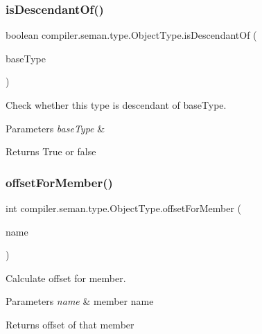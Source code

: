 \subsubsection{\texorpdfstring{is\+Descendant\+Of()}{isDescendantOf()}}
{\footnotesize\ttfamily boolean compiler.\+seman.\+type.\+Object\+Type.\+is\+Descendant\+Of (\begin{DoxyParamCaption}\item[{\hyperlink{classcompiler_1_1seman_1_1type_1_1_object_type}{Object\+Type}}]{base\+Type }\end{DoxyParamCaption})}

Check whether this type is descendant of base\+Type. 
\begin{DoxyParams}{Parameters}
{\em base\+Type} & \\
\hline
\end{DoxyParams}
\begin{DoxyReturn}{Returns}
True or false 
\end{DoxyReturn}
\mbox{\label{classcompiler_1_1seman_1_1type_1_1_object_type_a2b0119cb5d5451bbf5cad5e9844c136f}} 
\subsubsection{\texorpdfstring{offset\+For\+Member()}{offsetForMember()}}
{\footnotesize\ttfamily int compiler.\+seman.\+type.\+Object\+Type.\+offset\+For\+Member (\begin{DoxyParamCaption}\item[{String}]{name }\end{DoxyParamCaption})}

Calculate offset for member. 
\begin{DoxyParams}{Parameters}
{\em name} & member name \\
\hline
\end{DoxyParams}
\begin{DoxyReturn}{Returns}
offset of that member 
\end{DoxyReturn}
\mbox{\label{classcompiler_1_1seman_1_1type_1_1_object_type_a943e5eb0e4e688e93d21915905d741ca}} 
